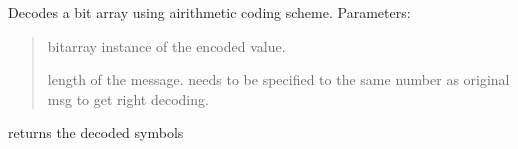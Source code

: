 \documentclass[letterpaper,10pt,english]{sphinxmanual}
\begin{document}
\begin{fulllineitems}
\begin{fulllineitems}
\label{\detokenize{arithmetic_coding:arithmetic_coding.ArithmeticDecoder.decode}}
\pysigstartsignatures
{}
\pysigstopsignatures
\sphinxAtStartPar
Decodes a bit array using airithmetic coding scheme. 
Parameters:
\begin{quote}
\begin{description}
\sphinxAtStartPar
bitarray instance of the encoded value.

\sphinxAtStartPar
length of the message. needs to be specified to the same number as original msg to get right decoding.

\end{description}
\end{quote}
\begin{description}
\begin{description}
\sphinxAtStartPar
returns the decoded symbols

\end{description}

\end{description}

\end{fulllineitems}


\end{fulllineitems}

\end{document}
